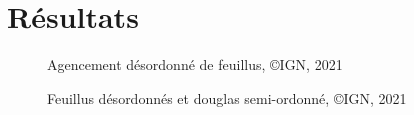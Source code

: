 \documentclass{article}
\begin{document}
	\section{Résultats}
		\centering
		\begin{figure}[!h]
			\caption{Agencement désordonné de feuillus, \copyright IGN, 2021}
		\end{figure}
		\begin{figure}[!h]
			\caption{Feuillus désordonnés et douglas semi-ordonné, \copyright IGN, 2021}
		\end{figure}
	
\end{document}
